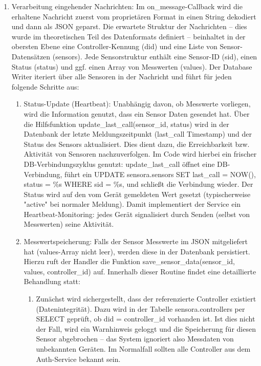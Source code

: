 \begin{enumerate}
    \item Verarbeitung eingehender Nachrichten: Im on\_message-Callback wird die erhaltene Nachricht zuerst vom proprietären Format in einen String dekodiert und dann als JSON geparst. Die erwartete Struktur der Nachrichten – dies wurde im theoretischen Teil des Datenformats definiert – beinhaltet in der obersten Ebene eine Controller-Kennung (did) und eine Liste von Sensor-Datensätzen (sensors). Jede Sensorstruktur enthält eine Sensor-ID (sid), einen Status (status) und ggf. einen Array von Messwerten (values). Der Database Writer iteriert über alle Sensoren in der Nachricht und führt für jeden folgende Schritte aus:
    \begin{enumerate}
        \item Status-Update (Heartbeat): Unabhängig davon, ob Messwerte vorliegen, wird die Information genutzt, dass ein Sensor Daten gesendet hat. Über die Hilfsfunktion update\_last\_call(sensor\_id, status) wird in der Datenbank der letzte Meldungszeitpunkt (last\_call Timestamp) und der Status des Sensors aktualisiert. Dies dient dazu, die Erreichbarkeit bzw. Aktivität von Sensoren nachzuverfolgen. Im Code wird hierbei ein frischer DB-Verbindungszyklus genutzt: update\_last\_call öffnet eine DB-Verbindung, führt ein UPDATE sensora.sensors SET last\_call = NOW(), status = \%s WHERE sid = \%s, und schließt die Verbindung wieder. Der Status wird auf den vom Gerät gemeldeten Wert gesetzt (typischerweise "active" bei normaler Meldung). Damit implementiert der Service ein Heartbeat-Monitoring: jedes Gerät signalisiert durch Senden (selbst von Messwerten) seine Aktivität.
        \item Messwertspeicherung: Falls der Sensor Messwerte im JSON mitgeliefert hat (values-Array nicht leer), werden diese in der Datenbank persistiert. Hierzu ruft der Handler die Funktion save\_sensor\_data(sensor\_id, values, controller\_id) auf. Innerhalb dieser Routine findet eine detaillierte Behandlung statt:
        \begin{enumerate}
            \item Zunächst wird sichergestellt, dass der referenzierte Controller existiert (Datenintegrität). Dazu wird in der Tabelle sensora.controllers per SELECT geprüft, ob did = controller\_id vorhanden ist. Ist dies nicht der Fall, wird ein Warnhinweis geloggt und die Speicherung für diesen Sensor abgebrochen – das System ignoriert also Messdaten von unbekannten Geräten. Im Normalfall sollten alle Controller aus dem Auth-Service bekannt sein.

\end{enumerate}
\end{enumerate}
\end{enumerate}
